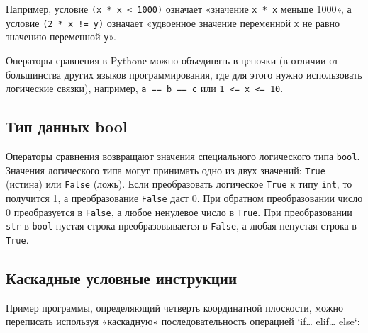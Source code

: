 Например, условие \texttt{(x\ *\ x\ \textless{}\ 1000)} означает
«значение \texttt{x\ *\ x} меньше 1000», а условие
\texttt{(2\ *\ x\ !=\ y)} означает «удвоенное значение переменной
\texttt{x} не равно значению переменной \texttt{y}».

Операторы сравнения в Pythonе можно объединять в цепочки (в отличии от
большинства других языков программирования, где для этого нужно
использовать логические связки), например, \texttt{a\ ==\ b\ ==\ c} или
\texttt{1\ \textless{}=\ x\ \textless{}=\ 10}.

\subsection{Тип данных
bool}\label{ux442ux438ux43f-ux434ux430ux43dux43dux44bux445-bool}

Операторы сравнения возвращают значения специального логического типа
\texttt{bool}. Значения логического типа могут принимать одно из двух
значений: \texttt{True} (истина) или \texttt{False} (ложь). Если
преобразовать логическое \texttt{True} к типу \texttt{int}, то получится
1, а преобразование \texttt{False} даст 0. При обратном преобразовании
число 0 преобразуется в \texttt{False}, а любое ненулевое число в
\texttt{True}. При преобразовании \texttt{str} в \texttt{bool} пустая
строка преобразовывается в \texttt{False}, а любая непустая строка в
\texttt{True}.

\subsection{Каскадные условные
инструкции}\label{ux43aux430ux441ux43aux430ux434ux43dux44bux435-ux443ux441ux43bux43eux432ux43dux44bux435-ux438ux43dux441ux442ux440ux443ux43aux446ux438ux438}

Пример программы, определяющий четверть координатной плоскости, можно
переписать используя «каскадную« последовательность операцией
`if\ldots{} elif\ldots{} else`:

\begin{Shaded}
\begin{Highlighting}[]
\OperatorTok{=} \NormalTok{(}\NormalTok{())}
\OperatorTok{=} \NormalTok{(}\NormalTok{())}
 \OperatorTok{>}   \OperatorTok{>} \NormalTok{:}
    \NormalTok{(}\NormalTok{)}
 \OperatorTok{>}   \OperatorTok{<} \NormalTok{:}
    \NormalTok{(}\NormalTok{)}
 \OperatorTok{>} \NormalTok{:}
    \NormalTok{(}\NormalTok{)}
\NormalTok{:}
    \NormalTok{(}\NormalTok{)}
\end{Highlighting}
\end{Shaded}

